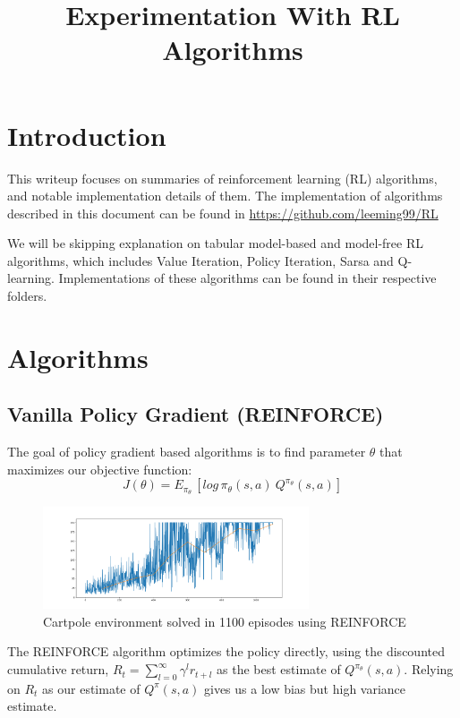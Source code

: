 \documentclass[11pt]{article} %
\title{Experimentation With RL Algorithms}
\author{}
\date{}
\begin{document}
\maketitle

\tableofcontents

\newpage

\section{Introduction}
This writeup focuses on summaries of reinforcement learning (RL) algorithms, and notable implementation details of them. The implementation of algorithms described in this document can be found in \url{https://github.com/leeming99/RL}

We will be skipping explanation on tabular model-based and model-free RL algorithms, which includes Value Iteration, Policy Iteration, Sarsa and Q-learning. Implementations of these algorithms can be found in their respective folders.
\section{Algorithms}
\subsection{Vanilla Policy Gradient (REINFORCE)}
The goal of policy gradient based algorithms is to find parameter $\theta$ that maximizes our objective function:
\begin{equation*}
    J(\theta) = E_{\pi_\theta}\,[log\,\pi_\theta(s,a)\: Q^{\pi_\theta}(s,a)]
\end{equation*}
\begin{figure}
    \centering
    \includegraphics[width=0.7\textwidth]{vanilla_policy_gradient/Solved_cartpole_1100eps.png}
    \caption{Cartpole environment solved in 1100 episodes using REINFORCE}
\end{figure}
The REINFORCE algorithm \cite{reinforce} optimizes the policy directly, using the discounted cumulative return, $R_t = \sum_{l=0}^\infty \gamma^l r_{t+l}$ as the best estimate of $Q^{\pi_\theta}(s,a)$. Relying on $R_t$ as our estimate of $Q^{\pi}(s,a)$ gives us a low bias but high variance estimate. 
\end{document}
